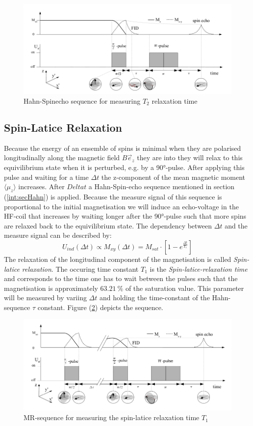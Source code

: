 		\begin{figure}[h]
			\centering
			\includegraphics[scale = 0.4]{pic/intro_t2}
			\caption{Hahn-Spinecho sequence for measuring $T_2$ relaxation time}
			\label{int:t2}
		\end{figure}
	\subsection{Spin-Latice Relaxation}
		Because the energy of an ensemble of spins is minimal when they are polarised longitudinally along the magnetic field $B\vec{e}_z$ they are into they will relax to this equivilibrium state when it is perturbed, e.g. by a 90°-pulse. After applying this pulse and waiting for a time $\Delta t$ the z-component of the mean magnetic moment $\langle \mu_z \rangle$ increases. After $Delta t$ a Hahn-Spin-echo sequence mentioned in section (\ref{int:secHahn}) is applied.  Because the measure signal of this sequence is proportional to the initial magnetisation we will induce an echo-voltage in the HF-coil that increases by waiting longer after the 90°-pulse such that more spins are relaxed back to the equivilibrium state. The dependency between $\Delta t$ and the measure signal can be described by:
		\begin{equation}
			U_{ind}(\Delta t) \propto M_{xy}(\Delta t) = M_{sat} \cdot [1-e^{\frac{\Delta t}{T_1}}]
		\end{equation}
		The relaxation of the longitudinal component of the magnetisation is called \textit{Spin-latice relaxation}. The occuring time constant $T_1$ is the \textit{Spin-latice-relaxation time} and corresponds to the time one has to wait between the pulses such that the magnetisation is approximately $63.21\ \unit{\%}$ of the saturation value. This parameter will be measured by variing $\Delta t$ and holding the time-constant of the Hahn-sequence $\tau$ constant. Figure (\ref{int:t1}) depicts the sequence.
		
		\begin{figure}[h]
					\centering
					\includegraphics[scale = 0.4]{pic/intro_t1}
					\caption{MR-sequence for measuring the spin-latice relaxation time $T_1$}
					\label{int:t1}
		\end{figure}